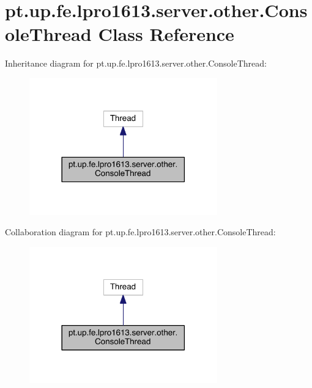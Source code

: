 \hypertarget{classpt_1_1up_1_1fe_1_1lpro1613_1_1server_1_1other_1_1_console_thread}{}\section{pt.\+up.\+fe.\+lpro1613.\+server.\+other.\+Console\+Thread Class Reference}
\label{classpt_1_1up_1_1fe_1_1lpro1613_1_1server_1_1other_1_1_console_thread}


Inheritance diagram for pt.\+up.\+fe.\+lpro1613.\+server.\+other.\+Console\+Thread\+:
\nopagebreak
\begin{figure}[H]
\begin{center}
\leavevmode
\includegraphics[width=230pt]{classpt_1_1up_1_1fe_1_1lpro1613_1_1server_1_1other_1_1_console_thread__inherit__graph}
\end{center}
\end{figure}


Collaboration diagram for pt.\+up.\+fe.\+lpro1613.\+server.\+other.\+Console\+Thread\+:
\nopagebreak
\begin{figure}[H]
\begin{center}
\leavevmode
\includegraphics[width=230pt]{classpt_1_1up_1_1fe_1_1lpro1613_1_1server_1_1other_1_1_console_thread__coll__graph}
\end{center}
\end{figure}
